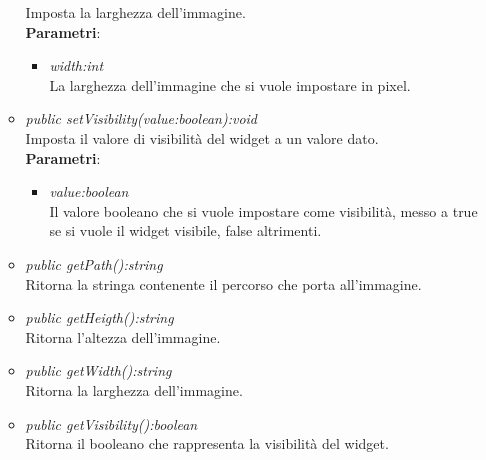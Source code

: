 \begin{itemize}
\begin{itemize}
	Imposta la larghezza dell'immagine.
		\\ \textbf{Parametri}: \begin{itemize}
		\item \textit{width:int}\\
		La larghezza dell'immagine che si vuole impostare  in pixel.
		\end{itemize}
	\item \textit{public setVisibility(value:boolean):void}\\
	Imposta il valore di visibilità del widget a un valore dato.
			\\ \textbf{Parametri}: \begin{itemize}
			\item \textit{value:boolean}\\
			Il valore booleano che si vuole impostare come visibilità, messo a true se si vuole il widget visibile, false altrimenti.
	\end{itemize}
	\item \textit{public getPath():string}\\
	Ritorna la stringa contenente il percorso che porta all'immagine.
	\item \textit{public getHeigth():string}\\
	Ritorna l'altezza dell'immagine.
	\item \textit{public getWidth():string}\\
	Ritorna la larghezza dell'immagine.\\
  	\item \textit{public getVisibility():boolean}\\
	Ritorna il booleano che rappresenta la visibilità del widget.
	\end{itemize}
\end{itemize}